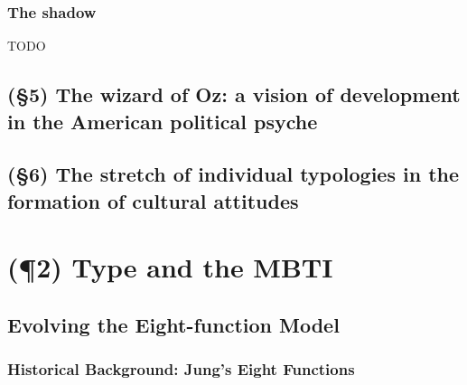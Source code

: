 \begin{enumerate}
\end{enumerate}

\subsubsection{The shadow}

TODO

\subsection{(\S5) The wizard of Oz: a vision of development in the American political psyche}

\subsection{(\S6) The stretch of individual typologies in the formation of cultural attitudes}

\section{(\P2) Type and the MBTI}

\subsection{Evolving the Eight-function Model}

\subsubsection{Historical Background: Jung's Eight Functions}

